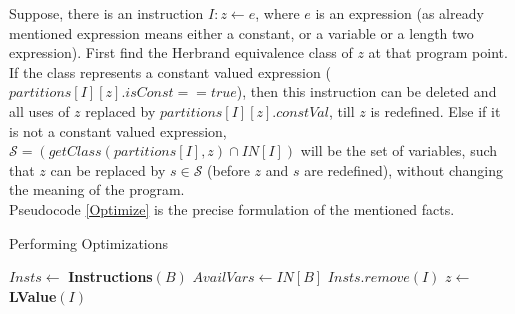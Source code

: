 Suppose, there is an instruction $I : z \gets e$, where $e$ is an 
expression (as already mentioned expression means either a constant, 
or a variable or a length two expression). First find the Herbrand 
equivalence class of $z$ at that program point. If the class represents
a constant valued expression ($partitions[I][z].isConst == true$), then
this instruction can be deleted and all uses of $z$ replaced by 
$partitions[I][z].constVal$, till $z$ is redefined. Else if it is not 
a constant valued expression, 
$\mathcal S = (getClass(partitions[I], z) \cap IN[I])$
will be the set of variables, such that $z$ can be replaced by 
$s \in \mathcal S$ (before $z$ and $s$ are redefined), without changing
the meaning of the program. \\ 
Pseudocode \ref{Optimize} is the precise formulation of the mentioned facts.

\begin{algorithm}
\caption{Performing Optimizations}\label{Optimize}
\begin{algorithmic}[1]
        \State $Insts \gets$ \textbf{Instructions}$(B)$
        \State $AvailVars \gets IN[B]$
        \State
            \State $Insts.remove(I)$
            \State $z \gets$ \textbf{LValue}$(I)$
\end{algorithmic}
\end{algorithm}
                    

